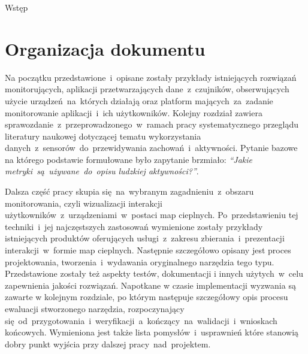 \begin{chapter}{Wstęp}
	\section{Organizacja dokumentu}
	Na początku przedstawione~i~opisane zostały przykłady istniejących rozwiązań monitorujących, aplikacji przetwarzających dane~z~czujników, obserwujących użycie urządzeń~na~których działają oraz platform mających~za~zadanie monitorowanie aplikacji~i~ich użytkowników. Kolejny rozdział zawiera sprawozdanie~z~przeprowadzonego~w~ramach pracy systematycznego przeglądu literatury naukowej dotyczącej tematu wykorzystania danych~z~sensorów~do~przewidywania zachowań~i~aktywności. Pytanie bazowe na którego podstawie formułowane było zapytanie brzmiało: {\it ``Jakie metryki~są~używane~do~opisu ludzkiej aktywności?''}. 
	
	Dalsza część pracy skupia się~na~wybranym zagadnieniu~z~obszaru monitorowania, czyli wizualizacji interakcji użytkowników~z~urządzeniami~w~postaci map cieplnych. Po~przedstawieniu tej techniki~i~jej najczęstszych zastosowań wymienione zostały przykłady istniejących produktów oferujących usługi~z~zakresu zbierania~i~prezentacji interakcji~w~formie map cieplnych. Następnie szczegółowo opisany jest proces projektowania, tworzenia~i~wydawania oryginalnego narzędzia tego typu. Przedstawione zostały też aspekty testów, dokumentacji i innych użytych~w~celu zapewnienia jakości rozwiązań. Napotkane w czasie implementacji wyzwania są zawarte w kolejnym rozdziale, po którym następuje szczegółowy opis procesu ewaluacji stworzonego narzędzia, rozpoczynający się~od~przygotowania~i~weryfikacji~a~kończący~na~walidacji~i~wnioskach końcowych. Wymieniona jest także lista pomysłów~i~usprawnień które stanowią dobry punkt wyjścia przy dalszej pracy~nad~projektem.
\end{chapter}

